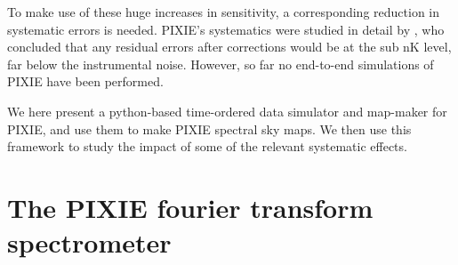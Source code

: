 \documentclass{article}
\begin{document}
To make use of these huge increases in sensitivity, a corresponding reduction in
systematic errors is needed. PIXIE's systematics were studied in detail by
\citet{pixie-systematics}, who concluded that any residual errors after corrections
would be at the sub nK level, far below the instrumental noise. However, so far
no end-to-end simulations of PIXIE have been performed.

We here present a python-based time-ordered data simulator and map-maker for PIXIE,
and use them to make PIXIE spectral sky maps. We then use this framework to
study the impact of some of the relevant systematic effects.

\section{The PIXIE fourier transform spectrometer}
\end{document}
